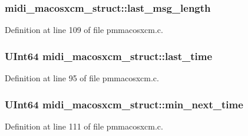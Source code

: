 \subsubsection[{\texorpdfstring{last\+\_\+msg\+\_\+length}{last_msg_length}}]{ midi\+\_\+macosxcm\+\_\+struct\+::last\+\_\+msg\+\_\+length}\hypertarget{structmidi__macosxcm__struct_a9bf23e7aec7e041e906193a05c761f96}{}\label{structmidi__macosxcm__struct_a9bf23e7aec7e041e906193a05c761f96}


Definition at line 109 of file pmmacosxcm.\+c.

\subsubsection[{\texorpdfstring{last\+\_\+time}{last_time}}]{\setlength{\rightskip}{0pt plus 5cm}U\+Int64 midi\+\_\+macosxcm\+\_\+struct\+::last\+\_\+time}\hypertarget{structmidi__macosxcm__struct_a303a040d9baf5a9392a4f9064897a1da}{}\label{structmidi__macosxcm__struct_a303a040d9baf5a9392a4f9064897a1da}


Definition at line 95 of file pmmacosxcm.\+c.

\subsubsection[{\texorpdfstring{min\+\_\+next\+\_\+time}{min_next_time}}]{\setlength{\rightskip}{0pt plus 5cm}U\+Int64 midi\+\_\+macosxcm\+\_\+struct\+::min\+\_\+next\+\_\+time}\hypertarget{structmidi__macosxcm__struct_aa3c3646a9072478138f298c0d7c3b719}{}\label{structmidi__macosxcm__struct_aa3c3646a9072478138f298c0d7c3b719}


Definition at line 111 of file pmmacosxcm.\+c.


